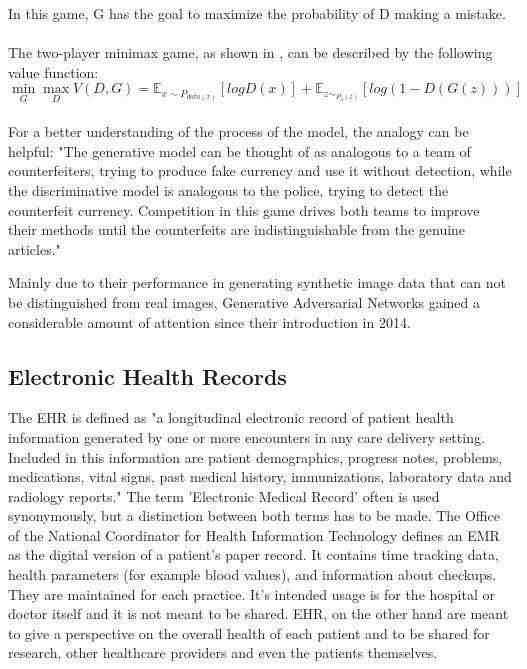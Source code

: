 \documentclass[11pt, a4paper]{book}
\begin{document}
In this game, G has the goal to maximize the probability of D making a mistake.  \cite{goodfellow2014generative}
\\
\\
The two-player minimax game, as shown in \cite{Goodfellow2014}, can be described by the following value function:
\\
\begin{equation}
	\min_G\max_DV(D,G) = \mathbb{E}_{x\sim{P_{data(x)}}}[log D(x)] + \mathbb{E}_{z\sim_{P_z(z)}}[log(1 - D(G(z)))]
\end{equation}
\\

For a better understanding of the process of the model, the analogy can be helpful:
"The generative model can be thought of as analogous to a team of counterfeiters, trying  to  produce  fake  currency  and  use  it  without  detection,  while  the  discriminative  model  is analogous to the police, trying to detect the counterfeit currency.  Competition in this game drives both teams to improve their methods until the counterfeits are indistinguishable from the genuine articles." \cite{goodfellow2014generative}

Mainly due to their performance in generating synthetic image data that can not be distinguished from real images, Generative Adversarial Networks gained a considerable amount of attention since their introduction in 2014.


\subsection{Electronic Health Records}
The EHR is defined as "a longitudinal electronic record of patient health information generated by one or more encounters in any care delivery setting. Included in this information are patient demographics, progress notes, problems, medications, vital signs, past medical history, immunizations, laboratory data and radiology reports." \cite{HIMMS}
The term 'Electronic Medical Record' often is used synonymously, but a distinction between both terms has to be made.
The Office of the National Coordinator for Health Information Technology defines an EMR as the digital version of a patient's paper record. It contains time tracking data, health parameters (for example blood values), and information about checkups. They are maintained for each practice. It's intended usage is for the hospital or doctor itself and it is not meant to be shared. \cite{ONC}
EHR, on the other hand are meant to give a perspective on the overall health of each patient and to be shared for research, other healthcare providers and even the patients themselves. \cite{ONC}
\end{document}
